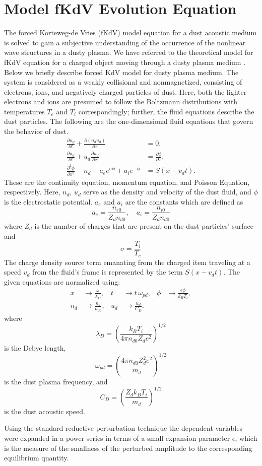 \documentclass[%
 aip,
 amsmath,amssymb,
 reprint,%
]{revtex4-1}
\begin{document}
\section{Model fKdV  Evolution Equation}
The forced Korteweg-de Vries (fKdV) model equation for a dust acoustic medium is solved to gain a subjective understanding of the occurrence of the nonlinear wave structures in a dusty plasma. We have referred to the  theoretical model for fKdV equation for a charged object moving through a dusty plasma medium . Below we briefly describe forced KdV model for dusty plasma medium. The system is considered as a weakly collisional and nonmagnetized, consisting of electrons, ions, and negatively charged particles of dust. Here, both the lighter electrons and ions are presumed to follow the Boltzmann distributions with temperatures $T_e$ and $T_i$ correspondingly; further, the fluid equations describe the dust particles. The following are the one-dimensional fluid equations that govern the behavior of dust.
\begin{align}
\frac{\partial n_d}{\partial t} + \frac{\partial (n_d u_d)}{\partial x} &= 0, \\
\frac{\partial u_d}{\partial t} + u_d \frac{\partial u_d}{\partial x} &= \frac{\partial \phi}{\partial x}, \\
\frac{\partial^2 \phi}{\partial x^2} - n_d - a_e e^{\sigma \phi} + a_i e^{-\phi} &= S\left(x - v_d t\right).
\end{align}
These are the continuity equation,  momentum equation, and Poisson Equation, respectively.  Here, $n_d$, $u_d$ serve as the density and velocity of the dust fluid, and $\phi$ is the electrostatic potential. $a_e$ and $a_i$ are the constants which are defined as  \[a_e = \frac{n_{e0}}{Z_d n_{d0}}, \quad
a_i = \frac{n_{i0}}{Z_d n_{d0}}\]
where \( Z_d \) is the number of charges that are present on the dust particles' surface  and \[\sigma = \frac{T_i}{T_e}\]The charge density source term emanating from the charged item traveling at a speed $v_d$ from the fluid's frame is represented by the term \( S(x - v_d t) \). 
The given equations are normalized using:
\begin{align*}
x &\rightarrow \frac{x}{\lambda_D}, &
t &\rightarrow t \, \omega_{pd}, &
\phi &\rightarrow \frac{e \phi}{k_B T_i}, \\
n_d &\rightarrow \frac{n_d}{n_{d0}}, &
u_d &\rightarrow \frac{u_d}{C_D}.
\end{align*}
where \[\lambda_D = \left( \frac{k_B T_i}{4\pi n_{d0} Z_d e^2} \right)^{1/2}\]is the Debye length,\[\omega_{pd} = \left(\frac{4\pi n_{d0}Z_d^2 e^2}{m_d} \right)^{1/2}\]is the dust plasma frequency, and\[C_D = \left( \frac{Z_d k_B T_i}{m_d} \right)^{1/2}\]
is the dust acoustic speed. 
\par Using the standard reductive perturbation technique \cite{r1,r27} the dependent variables were expanded in a power series in terms of a small expansion parameter $\epsilon$, which is the measure of the smallness of the perturbed amplitude to the corresponding
equilibrium quantity. 
\end{document}
